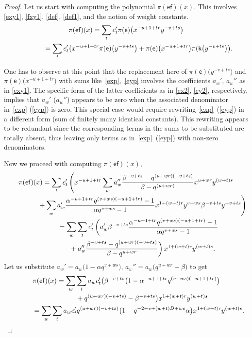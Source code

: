 \documentclass[pdftex]{sigma}
\numberwithin{equation}{section}
\begin{document}
\begin{proof} Let us start with computing the polynomial $\pi(\mathsf{ef})(x)$. This involves \eqref{exy1}, \eqref{fxy1}, \eqref{def}, \eqref{def1}, and the notion of weight constants.
\begin{gather*}
\pi(\mathsf{ef})(x)=\sum_tc_t'\pi(\mathsf{e})\big(x^{-u+1+tr}y^{-v+ts}\big)\\
\hphantom{\pi(\mathsf{ef})(x)}{} =\sum_tc_t'\big(x^{-u+1+tr}\pi(\mathsf{e})\big(y^{-v+ts}\big)+\pi(\mathsf{e})\big(x^{-u+1+tr}\big)\pi(\mathsf{k}\big(y^{-v+ts}\big)\big).
\end{gather*}

One has to observe at this point that the replacement here of $\pi(\mathsf{e})\big(y^{-v+ts}\big)$ and $\pi(\mathsf{e})\big(x^{-u+1+tr}\big)$ with sums like~\eqref{exp},~\eqref{eyp} involves the coefficients $a_w'$, $a_w''$ as in \eqref{exy1}. The specific form of the latter coefficients as in \eqref{ex2}, \eqref{ey2}, respectively, implies that $a_w'$ ($a_w''$) appears to be zero when the associated denominator in~\eqref{exp} (\eqref{eyp}) is zero. This special case would require rewri\-ting~\eqref{exp}~(\eqref{eyp}) in a different form (sum of finitely many identical constants). This rewriting appears to be redundant since the corresponding terms in the sums to be substituted are totally absent, thus leaving only terms as in~\eqref{exp}~(\eqref{eyp}) with non-zero denominators.

Now we proceed with computing $\pi(\mathsf{ef})(x)$,
\begin{gather*}
\pi(\mathsf{ef})(x)=\sum_tc_t'\left(x^{-u+1+tr}\sum_wa_w''
\frac{\beta^{-v+ts}-q^{(u+wr)(-v+ts)}}{\beta-q^{(u+wr)}}x^{u+wr}y^{(w+t)s} \right.\\
 \left.\hphantom{\pi(\mathsf{ef})(x)=}{} +\sum_wa_w'\frac{\alpha^{-u+1+tr}q^{(v+ws)(-u+1+tr)}-1}{\alpha q^{v+ws}-1}x^{1+(w+t)r}y^{v+ws}\beta^{-v+ts}y^{-v+ts}\right)\\
\hphantom{\pi(\mathsf{ef})(x)}{} =\sum_w\sum_tc_t'\left(a_w'\beta^{-v+ts} \frac{\alpha^{-u+1+tr}q^{(v+ws)(-u+1+tr)}-1}{\alpha q^{v+ws}-1} \right.\\
 \left. \hphantom{\pi(\mathsf{ef})(x)=}{} +a_w''\frac{\beta^{-v+ts}-q^{(u+wr)(-v+ts)}}{\beta-q^{u+wr}}\right) x^{1+(w+t)r}y^{(w+t)s}.
\end{gather*}
Let us substitute $a_w'=a_w\big(1-\alpha q^{v+ws}\big)$, $a_w''=a_w\big(q^{u+wr}-\beta\big)$ to get
\begin{gather*}
\pi(\mathsf{ef})(x)=\sum_w\sum_ta_wc_t' \big(\beta^{-v+ts}\big(1-\alpha^{-u+1+tr}q^{(v+ws)(-u+1+tr)}\big)\\
\hphantom{\pi(\mathsf{ef})(x)=}{} +q^{(u+wr)(-v+ts)}-\beta^{-v+ts}\big)x^{1+(w+t)r}y^{(w+t)s}\\
\hphantom{\pi(\mathsf{ef})(x)}{} =\sum_w\sum_ta_wc_t'q^{(u+wr)(-v+ts)}\big(1-q^{-2+v+(w+t)D+ws}\alpha\big)x^{1+(w+t)r}y^{(w+t)s}.
\end{gather*}


\end{proof}
\end{document}
